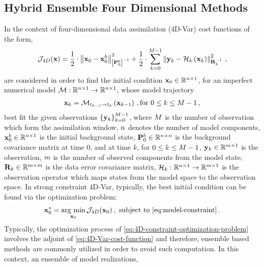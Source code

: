 \subsection{Hybrid Ensemble Four Dimensional Methods}
\label{subsec:hybrid-methods}
In the context of four-dimensional data assimilation (4D-Var) cost functions of the form,
\begin{eqnarray}
\label{eq:4D-Var-cost-function}
\displaystyle
\mathcal{J}_{4D}({\bf x}) = \frac{1}{2} \cdot \left \| {\bf x}_0-{\bf x}_0^b \right \|_{\left [ {\bf P}^b_{0} \right ]^{-1}}^2 + \frac{1}{2} \cdot \sum_{k=0}^{M-1} \left \| {\bf y}_k-\mathcal{H}_k \left ( {\bf x}_k \right ) \right \|^2_{{\bf R}_k^{-1}} \,,
\end{eqnarray}
%
are considered in order to find the initial condition ${\bf x}_0 \in \mathbb{R}^{n \times 1}$, for an imperfect numerical model $\mathcal{M}:\mathbb{R}^{n \times 1} \rightarrow \mathbb{R}^{n \times 1}$, whose model trajectory
\begin{eqnarray}
\label{eq:model-constraint}
\displaystyle
{\bf x}_{k} = \mathcal{M}_{t_{k-1} \rightarrow t_k} \left ( {\bf x}_{k-1}\right )  \,, \text{for $0 \le k \le M-1$}\,,
\end{eqnarray}
best fit the given observations $\left \{ {\bf y}_k \right \}_{k=0}^{M-1}$, where $M$ is the number of observation which form the assimilation window, $n$ denotes the number of model components, ${\bf x}_0^b \in \mathbb{R}^{n \times 1}$ is the initial background state, ${\bf P}^b_0 \in \mathbb{R}^{n \times n}$ is the background covariance matrix at time 0, and at time $k$, for $0 \le k \le M-1$, ${\bf y}_k \in \mathbb{R}^{m \times 1}$ is the observation, $m$ is the number of observed components from the model state, ${\bf R}_k \in \mathbb{R}^{m \times m}$ is the data error covariance matrix, $\mathcal{H}_k:\mathbb{R}^{n \times 1} \rightarrow \mathbb{R}^{m \times 1}$ is the observation operator which maps states from the model space to the observation space. In strong constraint 4D-Var, typically, the best initial condition can be found via the optimization problem:
\begin{eqnarray}
\label{eq:4D-constraint-optimization-problem}
\displaystyle
{\bf x}_0^{*} = \underset{{\bf x}_0}{\arg\,\min} \, \mathcal{J}_{4D}({\bf x}_0) \,,\text{ subject to \eqref{eq:model-constraint}} \,.
\end{eqnarray}
%
Typically, the optimization process of \eqref{eq:4D-constraint-optimization-problem} involves the adjoint of \eqref{eq:4D-Var-cost-function} and therefore, ensemble based methods are commonly utilized in order to avoid such computation. In this context, an ensemble of model realizations,

